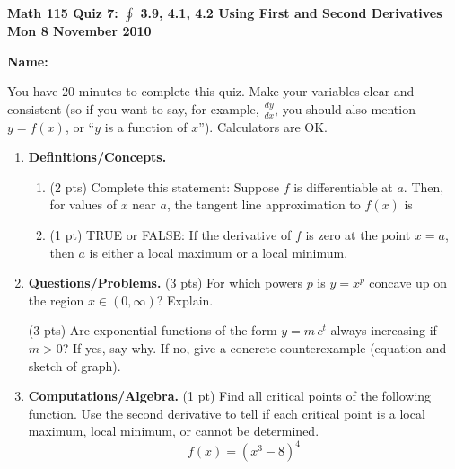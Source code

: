\documentclass[11pt,letterpaper]{article}
\begin{document}
\flushleft
\begin{multicols}{2}


\begin{large}\textbf{Math 115 Quiz 7: $\oint $ 3.9, 4.1, 4.2 Using First and Second Derivatives \\
Mon 8 November 2010}\end{large}

\textbf{Name:  }\underline{\hspace{35ex}}

\vspace{.5in}

\end{multicols}

\pagestyle{empty}

\flushleft

You have 20 minutes to complete this quiz.  Make your variables clear and
consistent (so if you want to say, for example, $\frac{dy}{dx}$, you should also
mention $y=f(x)$, or ``$y$ is a function of $x$'').  Calculators are OK.  

\begin{enumerate}
\item \textbf{Definitions/Concepts.} 
\begin{enumerate}
 \item (2 pts) Complete this statement:  Suppose $f$ is differentiable at $a$.  Then, for values of $x$ near $a$, the tangent line approximation to $f(x)$ is

\vspace{3pc}
\item (1 pt) TRUE or FALSE: If the derivative of $f$ is zero at the point $x=a$, then $a$ is either a local maximum or a local minimum.
\end{enumerate}

\vspace{1pc}
\item \textbf{Questions/Problems.} (3 pts) For which powers $p$ is $y=x^p$ concave up on the
region $x\in (0,\infty)$?  Explain.

\vspace{6pc}
\noindent (3 pts) Are exponential functions of the form $y=m\,c^t$
always increasing if $m>0$? If yes, say why. If no, give a
concrete counterexample (equation and sketch of graph).

\vspace{6pc}

\item \textbf{Computations/Algebra.} (1 pt) Find all critical points of the following function.  Use the second derivative to tell if each critical point is a local maximum, local minimum, or cannot be determined. 
\[f(x)=(x^3-8)^4\]
\end{enumerate}


\vspace{1pc}
\end{document}
